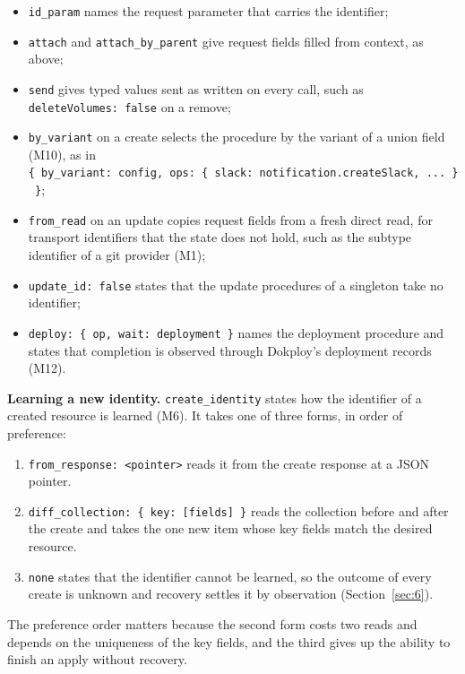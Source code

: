 \begin{itemize}
\item
  \texttt{id\_param} names the request parameter that carries the identifier;
\item
  \texttt{attach} and \texttt{attach\_by\_parent} give request fields filled from context, as above;
\item
  \texttt{send} gives typed values sent as written on every call, such as \texttt{deleteVolumes:\ false} on a remove;
\item
  \texttt{by\_variant} on a create selects the procedure by the variant of a union field (M10), as in
  \texttt{\{\ by\_variant:\ config,\ ops:\ \{\ slack:\ notification.createSlack,\ ...\ \}\ \}};
\item
  \texttt{from\_read} on an update copies request fields from a fresh direct read, for transport identifiers
  that the state does not hold, such as the subtype identifier of a git provider (M1);
\item
  \texttt{update\_id:\ false} states that the update procedures of a singleton take no identifier;
\item
  \texttt{deploy:\ \{\ op,\ wait:\ deployment\ \}} names the deployment procedure and states that completion is
  observed through Dokploy's deployment records (M12).
\end{itemize}

\textbf{Learning a new identity.} \texttt{create\_identity} states how the identifier of a created resource is
learned (M6). It takes one of three forms, in order of preference:

\begin{enumerate}
\def\labelenumi{\arabic{enumi}.}
\item
  \texttt{from\_response:\ \textless{}pointer\textgreater{}} reads it from the create response at a JSON pointer.
\item
  \texttt{diff\_collection:\ \{\ key:\ {[}fields{]}\ \}} reads the collection before and after the create and takes the
  one new item whose key fields match the desired resource.
\item
  \texttt{none} states that the identifier cannot be learned, so the outcome of every create is unknown and
  recovery settles it by observation (Section~\ref{sec:6}).
\end{enumerate}

The preference order matters because the second form costs two reads and depends on the uniqueness
of the key fields, and the third gives up the ability to finish an apply without recovery.

